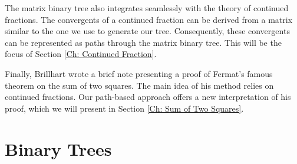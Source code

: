 \documentclass[12pt]{article}
\theoremstyle{plain}
\theoremstyle{definition}
\theoremstyle{remark}
\begin{document}
The matrix binary tree also integrates seamlessly with the theory of continued fractions. The convergents of a continued fraction can be derived from a matrix similar to the one we use to generate our tree. Consequently, these convergents can be represented as paths through the matrix binary tree. This will be the focus of Section \ref{Ch: Continued Fraction}. 

Finally, Brillhart wrote a brief note \cite{Brillhart} presenting a proof of Fermat's famous theorem on the sum of two squares. The main idea of his method relies on continued fractions. Our path-based approach offers a new interpretation of his proof, which we will present in Section \ref{Ch: Sum of Two Squares}. 

\section{Binary Trees} \label{Ch: Binary Tree}
\end{document}

